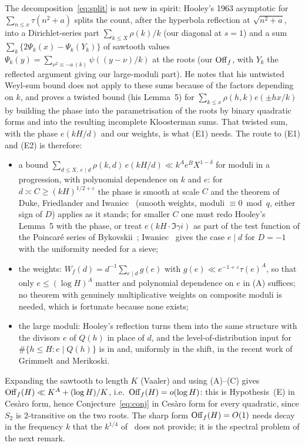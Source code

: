 \documentclass[11pt,a4paper]{article}
\theoremstyle{remark}\newtheorem{remark}[theorem]{Remark}
\begin{document}
The decomposition~\eqref{eq:split} is not new in spirit: Hooley's 1963 asymptotic for $\sum_{n\le x}\tau(n^2+a)$
\cite{Hooley1963} splits the count, after the hyperbola reflection at $\sqrt{n^2+a}$, into a Dirichlet-series
part $\sum_{k\le X}\rho(k)/k$ (our diagonal at $s=1$) and a sum $\sum_k\{2\Psi_k(x)-\Psi_k(Y_k)\}$ of sawtooth
values $\Psi_k(y)=\sum_{\nu^2\equiv-a\,(k)}\psi((y-\nu)/k)$ at the roots (our $\mathrm{Off}_f$, with $Y_k$ the reflected
argument giving our large-moduli part). He notes that his untwisted Weyl-sum bound does not apply to these
sums because of the factors depending on $k$, and proves a twisted bound (his Lemma~5) for
$\sum_{k\le x}\rho(h,k)e(\pm hx/k)$ by building the phase into the parametrisation of the roots by binary
quadratic forms and into the resulting incomplete Kloosterman sums. That twisted sum, with the phase $e(kH/d)$
and our weights, is what (E1) needs. The route to (E1) and (E2) is therefore:
\begin{itemize}
\item[(A)] a bound $\sum_{d\le X,\ e\mid d}\rho(k,d)\,e(kH/d)\ll k^{A}e^{B}X^{1-\delta}$ for moduli in a
progression, with polynomial dependence on $k$ and $e$: for $d\asymp C\ge(kH)^{1/2+\varepsilon}$ the phase is
smooth at scale $C$ and the theorem of Duke, Friedlander and Iwaniec~\cite{DFI2012} (smooth weights, moduli
$\equiv0\bmod q$, either sign of $D$) applies as it stands; for smaller $C$ one must redo Hooley's Lemma~5 with
the phase, or treat $e(kH\cdot\Im\gamma i)$ as part of the test function of the Poincar\'e series of
Bykovskii~\cite{Bykovskii1984}; Iwaniec~\cite{Iwaniec1978} gives the case $e\mid d$ for $D=-1$ with the
uniformity needed for a sieve;
\item[(B)] the weights: $W_f(d)=d^{-1}\sum_{e\mid d}g(e)$ with $g(e)\ll e^{-1+\varepsilon}\tau(e)^{A}$, so that only
$e\le(\log H)^{A}$ matter and polynomial dependence on $e$ in (A) suffices; no theorem with genuinely
multiplicative weights on composite moduli is needed, which is fortunate because none exists;
\item[(C)] the large moduli: Hooley's reflection turns them into the same structure with the divisors $e$ of
$Q(h)$ in place of $d$, and the level-of-distribution input for $\#\{h\le H:e\mid Q(h)\}$ is in
\cite{Iwaniec1978} and, uniformly in the shift, in the recent work of Grimmelt and Merikoski.
\end{itemize}
Expanding the sawtooth to length $K$ (Vaaler) and using (A)--(C) gives $\mathrm{Off}_f(H)\ll K^{A}+(\log H)/K$, i.e.\
$\mathrm{Off}_f(H)=o(\log H)$: this is Hypothesis~(E) in Ces\`aro form, hence Conjecture~\eqref{eq:conj} in Ces\`aro form
for every quadratic, since $S_2$ is $2$-transitive on the two roots. The sharp form $\mathrm{Off}_f(H)=O(1)$ needs decay
in the frequency $k$ that the $k^{1/4}$ of~\cite{DFI2012} does not provide; it is the spectral problem of the next
remark.
\end{document}
